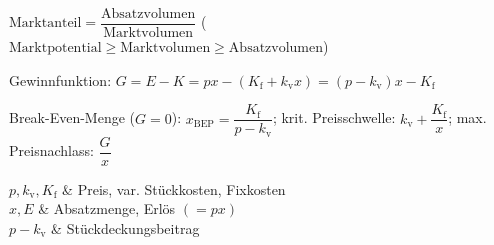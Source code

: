 
 \; $\text{Marktanteil} = \dfrac{\text{Absatzvolumen}}{\text{Marktvolumen}}$ \quad ($\text{Marktpotential} \ge \text{Marktvolumen} \ge \text{Absatzvolumen}$)

\begin{minipage}[c]{0.56\textwidth}
\centering
Gewinnfunktion: $G = E - K = p x - (K_{\mathrm{f}} + k_{\mathrm{v}} x) = (p - k_{\mathrm{v}}) x - K_{\mathrm{f}}$

Break-Even-Menge ($G=0$): $x_{\mathrm{BEP}} = \dfrac{K_{\mathrm{f}}}{p - k_{\mathrm{v}}}$; \quad
krit. Preisschwelle: $k_{\mathrm{v}} + \dfrac{K_{\mathrm{f}}}{x}$; \quad
max. Preisnachlass: $\dfrac{G}{x}$
\end{minipage}%
\hfill
\begin{minipage}[c]{0.38\textwidth}
\centering
\begin{symtable}[2.6cm]
	$p,k_{\mathrm{v}},K_{\mathrm{f}}$ & Preis, var. Stückkosten, Fixkosten \\
	$x,E$ & Absatzmenge, Erlös $(=px)$ \\
	$p-k_{\mathrm v}$ & Stückdeckungsbeitrag \\
\end{symtable}
\end{minipage}
